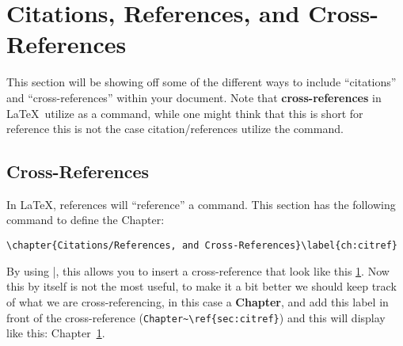 \chapter{Citations, References, and Cross-References}\label{ch:citref}
	This section will be showing off some of the different ways to include \enquote{citations} and \enquote{cross-references} within your document.
	Note that \textbf{cross-references} in \LaTeX\ utilize  as a command, while one might think that this is short for reference this is not the case citation/references utilize the  command.
	\section{Cross-References}
		In \LaTeX, references will \enquote{reference} a  command. 
		This section has the following command to define the Chapter:
		\begin{Center}
			\lstinline|\chapter{Citations/References, and Cross-References}\label{ch:citref}|
		\end{Center}
		By using |, this allows you to insert a cross\hyp{}reference that look like this \ref{ch:citref}.
		Now this by itself is not the most useful, to make it a bit better we should keep track of what we are cross\hyp{}referencing, in this case a \textbf{Chapter}, and add this label in front of the cross\hyp{}reference (\lstinline|Chapter~\ref{sec:citref}|) and this will display like this: Chapter~\ref{ch:citref}.
		

